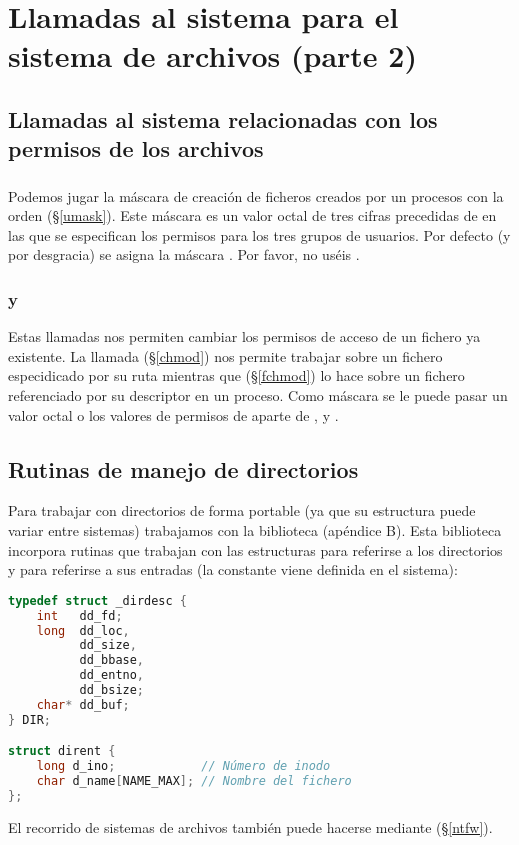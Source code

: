\section{Llamadas al sistema para el sistema de archivos (parte 2)}

\subsection{Llamadas al sistema relacionadas con los permisos de los archivos}

\subsubsection{}

Podemos jugar la máscara de creación de ficheros creados por un procesos con la orden  (\S\ref{umask}).
Este máscara es un valor octal de tres cifras precedidas de  en las que se especifican los permisos  para los tres grupos de usuarios.
Por defecto (y por desgracia) se asigna la máscara .
Por favor, no uséis .

\subsubsection{ y }

Estas llamadas nos permiten cambiar los permisos de acceso de un fichero ya existente.
La llamada  (\S\ref{chmod}) nos permite trabajar sobre un fichero especidicado por su ruta mientras que  (\S\ref{fchmod}) lo hace sobre un fichero referenciado por su descriptor en un proceso.
Como máscara se le puede pasar un valor octal o los valores de permisos de  aparte de ,  y .

\subsection{Rutinas de manejo de directorios}

Para trabajar con directorios de forma portable (ya que su estructura puede variar entre sistemas) trabajamos con la biblioteca  (apéndice B).
Esta biblioteca incorpora rutinas que trabajan con las estructuras  para referirse a los directorios y  para referirse a sus entradas (la constante  viene definida en el sistema):

\begin{lstlisting}[language=C]
typedef struct _dirdesc {
	int   dd_fd;
	long  dd_loc,
	      dd_size,
	      dd_bbase,
	      dd_entno,
	      dd_bsize;
	char* dd_buf;
} DIR;

struct dirent {
	long d_ino;            // Número de inodo
	char d_name[NAME_MAX]; // Nombre del fichero
};
\end{lstlisting}

El recorrido de sistemas de archivos también puede hacerse mediante  (\S\ref{ntfw}).

